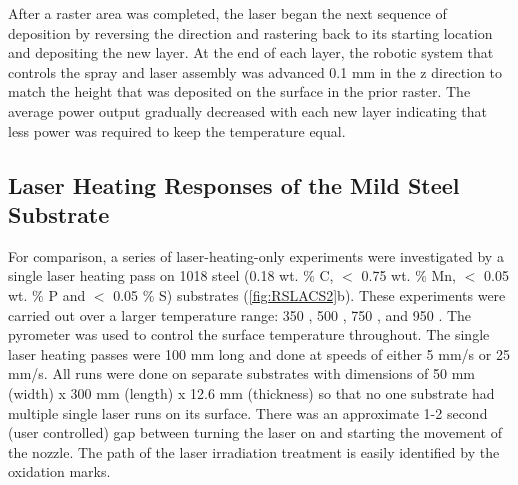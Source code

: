 	
		
		
		
		
		After a raster area was completed, the laser began the next sequence of deposition by reversing the direction and rastering back to its starting location and depositing the new layer. At the end of each layer, the robotic system that controls the spray and laser assembly was advanced 0.1 mm in the z direction to match the height that was deposited on the surface in the prior raster. The average power output gradually decreased with each new layer indicating that less power was required to keep the temperature equal.
		
		
	
	\subsection*{Laser Heating Responses of the Mild Steel Substrate}
	
	
		
		For comparison, a series of laser-heating-only experiments were investigated by a single laser heating pass on 1018 steel (0.18 wt. $\%$ C, $<$ 0.75 wt. $\%$ Mn, $<$ 0.05 wt. $\%$ P and $<$ 0.05 $\%$ S) substrates (\ref{fig:RSLACS2}b). These experiments were carried out over a larger temperature range: 350 \celsius{}, 500 \celsius{}, 750 \celsius{}, and 950 \celsius{}. The pyrometer was used to control the surface temperature throughout. The single laser heating passes were 100 mm long and done at speeds of either 5 mm/s or 25 mm/s. All runs were done on separate substrates with dimensions of 50 mm (width) x 300 mm (length) x 12.6 mm (thickness) so that no one substrate had multiple single laser runs on its surface. There was an approximate 1-2 second (user controlled) gap between turning the laser on and starting the movement of the nozzle. The path of the laser irradiation treatment is easily identified by the oxidation marks.
		

